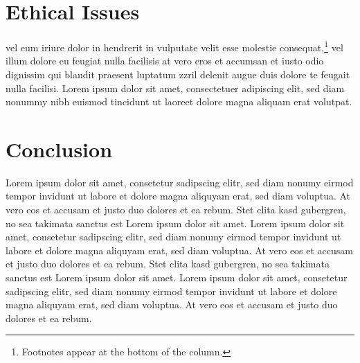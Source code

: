\documentclass{vgtc}                          %
\begin{document}
\section{Ethical Issues}

vel eum iriure dolor in hendrerit
in vulputate velit esse molestie consequat,\footnote{Footnotes
appear at the bottom of the column.} vel illum dolore eu
feugiat nulla facilisis at vero eros et accumsan et iusto odio
dignissim qui blandit praesent luptatum zzril delenit augue duis
dolore te feugait nulla facilisi. Lorem ipsum dolor sit amet,
consectetuer adipiscing elit, sed diam nonummy nibh euismod tincidunt
ut laoreet dolore magna aliquam erat volutpat.

\section{Conclusion}

Lorem ipsum dolor sit amet, consetetur sadipscing elitr, sed diam
nonumy eirmod tempor invidunt ut labore et dolore magna aliquyam erat,
sed diam voluptua. At vero eos et accusam et justo duo dolores et ea
rebum. Stet clita kasd gubergren, no sea takimata sanctus est Lorem
ipsum dolor sit amet. Lorem ipsum dolor sit amet, consetetur
sadipscing elitr, sed diam nonumy eirmod tempor invidunt ut labore et
dolore magna aliquyam erat, sed diam voluptua. At vero eos et accusam
et justo duo dolores et ea rebum. Stet clita kasd gubergren, no sea
takimata sanctus est Lorem ipsum dolor sit amet. Lorem ipsum dolor sit
amet, consetetur sadipscing elitr, sed diam nonumy eirmod tempor
invidunt ut labore et dolore magna aliquyam erat, sed diam
voluptua. At vero eos et accusam et justo duo dolores et ea
rebum.



%

%
%
%


\end{document}
